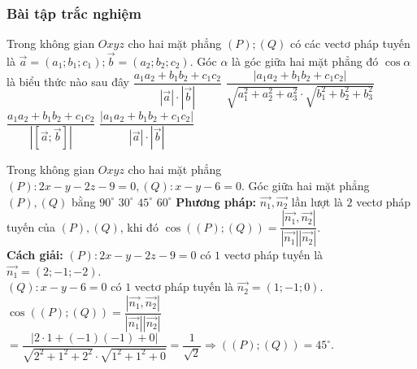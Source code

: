\subsubsection{Bài tập trắc nghiệm}
\begin{ex}%
	Trong không gian $Oxyz$ cho hai mặt phẳng $(P); (Q)$ có các vectơ pháp tuyến là $\vec{a}=\left(a_1; b_1; c_1\right);\vec{b}=\left(a_2; b_2; c_2\right)$. Góc $\alpha $ là góc giữa hai mặt phẳng đó $\cos\alpha $ là biểu thức nào sau đây
	\choice
	{$\dfrac{a_1a_2+b_1b_2+c_1c_2}{\left|{\vec{a}}\right|\cdot\left|{\vec{b}}\right|}$}
	{$\dfrac{\left|{a_1a_2+b_1b_2+c_1c_2}\right|}{\sqrt{a_1^2+a_2^2+a_3^2}\cdot\sqrt{b_1^2+b_2^2+b_3^2}}$}
	{$\dfrac{a_1a_2+b_1b_2+c_1c_2}{\left|{\left[{\vec{a};\vec{b}}\right]}\right|}$}
	{\True $\dfrac{\left|{a_1a_2+b_1b_2+c_1c_2}\right|}{\left|{\vec{a}}\right|\cdot\left|{\vec{b}}\right|}$}
\end{ex}
\begin{ex}%
	Trong không gian $Oxyz$  cho hai mặt phẳng $(P)\colon 2x - y-2z-9=0, (Q)\colon  x - y - 6=0$.    Góc giữa hai mặt phẳng  $(P), (Q)$ bằng
	\choice
	{$90^\circ$}
	{$30^\circ$}
	{\True $45^\circ$}
	{$60^\circ$}
	\loigiai
	{{\bfseries Phương pháp:}
		$\overrightarrow{n_1}, \overrightarrow{n_2}$  lần lượt là $2$ vectơ pháp tuyến của $(P), (Q)$, khi đó
		$\cos \left(\left( P \right);\left( Q \right)\right) = \dfrac{\left|\overrightarrow{n_1} ,\overrightarrow{n_2}\right|}{\left|\overrightarrow{n_1}\right|\left|\overrightarrow{n_2}\right|}$.\\
		{\bfseries Cách giải:}
		$(P)\colon 2x - y-2z-9=0$ có $1$ vectơ pháp tuyến là $\overrightarrow{n_1} = (2;-1;-2)$.\\
		$(Q)\colon  x - y - 6=0$ có $1$ vectơ pháp tuyến là $\overrightarrow{n_2} = (1;-1;0)$.\\
		$\cos \left(\left( P \right);\left( Q \right)\right) = \dfrac{\left|\overrightarrow{n_1}, \overrightarrow{n_2}\right|}{\left|\overrightarrow{n_1}\right|\left|\overrightarrow{n_2}\right|} $
		$= \dfrac{\left|2\cdot 1 + \left(- 1\right)\left(- 1\right) + 0\right|}{\sqrt{2^2 + 1^2 + 2^2}\cdot \sqrt{1^2+ 1^2 + 0}}= \dfrac{1}{\sqrt{2}} \Rightarrow \left(\left( P \right);\left( Q \right)\right) = 45^\circ$.
	}
\end{ex}

